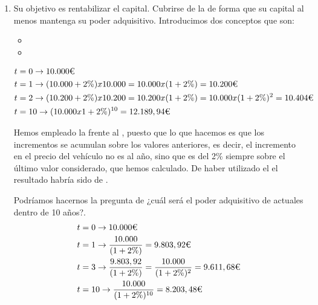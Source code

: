 \begin{enumerate}[label=\alph*)]
    \item Su objetivo es rentabilizar el capital. Cubrirse de la  de forma que su capital al menos mantenga su poder adquisitivo. Introducimos dos conceptos que son:
    \begin{itemize}
        \item {}
        \item {}
    \end{itemize}


    \begin{testexample}
        \begin{equation*}
            \begin{split}
                t &= 0 \rightarrow \euros{10.000} \\
                t &= 1 \rightarrow  (10.000 + 2\%) x 10.000 = 10.000 x (1 + 2\%) = \euros{10.200} \\
                t &= 2 \rightarrow (10.200 + 2\%) x 10.200 = 10.200 x (1+2\%) = 10.000 x (1+2\%)^2 = \euros{10.404} \\
                t &= 10 \rightarrow (10.000 x 1+2\%)^{10} = \euros{12.189,94}
            \end{split}
        \end{equation*}

        Hemos empleado la  frente al , puesto que lo que hacemos es que los incrementos se acumulan sobre los valores anteriores, es decir, el incremento en el precio del vehículo no es  al año, sino que es del 2\% siempre sobre el último valor considerado, que hemos calculado. De haber utilizado el  el resultado habría sido de .

        Podríamos hacernos la pregunta de ¿cuál será el poder adquisitivo de  actuales dentro de 10 años?.
        \begin{equation*}
            \begin{split}
                t &= 0 \rightarrow \euros{10.000} \\
                t &= 1 \rightarrow \frac{10.000}{(1+2\%)} = \euros{9.803,92} \\
                t &= 3 \rightarrow \frac{9.803,92}{(1+2\%)} = \frac{10.000}{(1+2\%)^2} = \euros{9.611,68} \\
                t &= 10 \rightarrow \frac{10.000}{(1+2\%)^{10}} = \euros{8.203,48}
            \end{split}
        \end{equation*}
    \end{testexample}


\end{enumerate}
